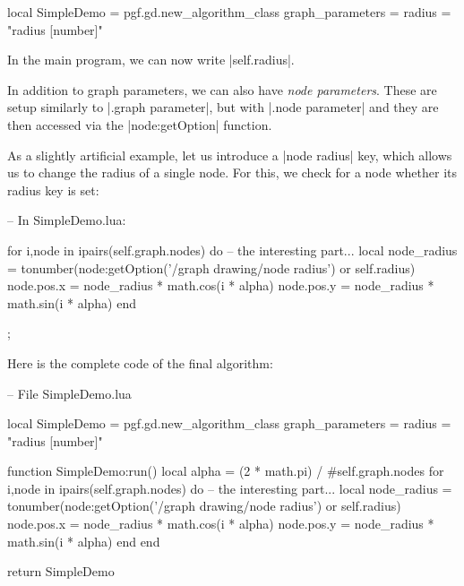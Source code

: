 \begin{codeexample}
local SimpleDemo = pgf.gd.new_algorithm_class {
  graph_parameters = { radius = "radius [number]" }
}
\end{codeexample}
In the main program, we can now write |self.radius|.

In addition to graph parameters, we can also have \emph{node
  parameters}. These are setup similarly to |.graph parameter|, but
with |.node parameter| and they are then accessed via the
|node:getOption| function.

As a slightly artificial example, let us introduce a |node radius|
key, which allows us to change the radius of a single node. For this,
we check for a node whether its radius key is set:

\begin{codeexample}
-- In SimpleDemo.lua:

  for i,node in ipairs(self.graph.nodes) do
    -- the interesting part...
    local node_radius = tonumber(node:getOption('/graph drawing/node radius')
                                 or self.radius)
    node.pos.x = node_radius * math.cos(i * alpha)
    node.pos.y = node_radius * math.sin(i * alpha)
  end
   
\end{codeexample}

\begin{codeexample}[]
\tikz {};
\end{codeexample}

Here is the complete code of the final algorithm:
\begin{codeexample}
-- File SimpleDemo.lua

local SimpleDemo = pgf.gd.new_algorithm_class {
  graph_parameters = { radius = "radius [number]" }
}

function SimpleDemo:run()
  local alpha = (2 * math.pi) / #self.graph.nodes
  for i,node in ipairs(self.graph.nodes) do
    -- the interesting part...
    local node_radius = tonumber(node:getOption('/graph drawing/node radius')
                                 or self.radius)
    node.pos.x = node_radius * math.cos(i * alpha)
    node.pos.y = node_radius * math.sin(i * alpha)
  end
end
   
return SimpleDemo  
\end{codeexample}

